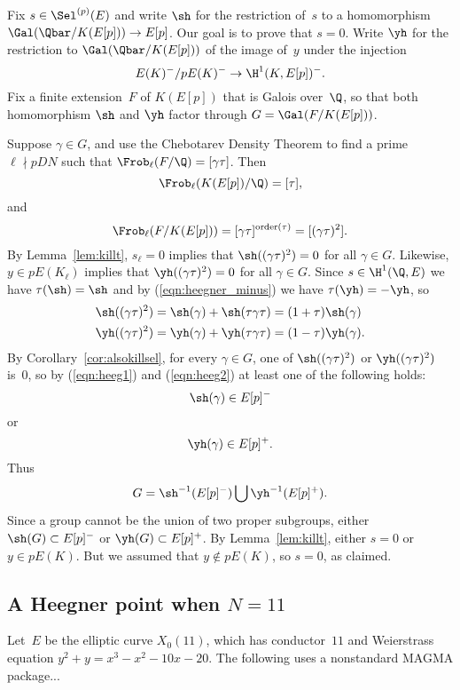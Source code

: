 \documentclass{report}
\begin{document}
Fix $s\in \Sel^{(p)}(E)$ and write $\sh$ for the restriction of~$s$ to
a homomorphism $\Gal(\Qbar/K(E[p]))\to{}E[p]$.  Our goal is to prove that
$s=0$.  Write $\yh$ for the restriction to $\Gal(\Qbar/K(E[p]))$
of the image of~$y$ under the injection
\begin{equation}\label{eqn:heegner_minus}
E(K)^-/p E(K)^- \to \H^1(K,E[p])^-.
\end{equation}
Fix a finite extension~$F$ of $K(E[p])$ that is Galois over~$\Q$,
so that both homomorphism $\sh$ and $\yh$ factor through
$G=\Gal(F/K(E[p]))$.

Suppose $\gamma\in G$, and use the Chebotarev Density Theorem to find
a prime $\ell\nmid pDN$ such that $\Frob_\ell(F/\Q)=[\gamma\tau]$.
Then $$\Frob_{\ell}(K(E[p])/\Q)=[\tau],$$ and
$$
\Frob_\ell(F/K(E[p])) = [\gamma\tau]^{\text{order}(\tau)} = [(\gamma\tau)^2].
$$
By Lemma~\ref{lem:killt}, $s_\ell=0$ implies that $\sh((\gamma\tau)^2)=0$
for all $\gamma\in G$.  Likewise, $y\in p E(K_\ell)$ implies that
$\yh((\gamma\tau)^2)=0$ for all $\gamma\in G$.
Since $s\in\H^1(\Q,E)$ we have $\tau(\sh) = \sh$ and
by (\ref{eqn:heegner_minus}) we have $\tau(\yh)=-\yh$, so
\begin{align}\label{eqn:heeg1}
   \sh((\gamma\tau)^2) &= \sh(\gamma) + \sh(\tau\gamma\tau) = (1+\tau)\sh(\gamma)\\\label{eqn:heeg2}
   \yh((\gamma\tau)^2) &= \yh(\gamma) + \yh(\tau\gamma\tau) = (1-\tau)\yh(\gamma).
\end{align}
By Corollary~\ref{cor:alsokillsel}, for every $\gamma\in G$, one of
$\sh((\gamma\tau)^2)$ or $\yh((\gamma\tau)^2)$ is~$0$, so by
(\ref{eqn:heeg1}) and (\ref{eqn:heeg2}) at least one of the following holds:
$$
\sh(\gamma) \in E[p]^-
$$
or
$$
\yh(\gamma) \in E[p]^+.
$$
Thus
$$
  G = \sh^{-1}(E[p]^-) \bigcup \yh^{-1}(E[p]^+).
$$
Since a group cannot be the union of two proper subgroups, either
$\sh(G) \subset E[p]^-$ or $\yh(G)\subset E[p]^+$.
By Lemma~\ref{lem:killt}, either $s=0$ or $y\in p E(K)$.  But we
assumed that $y \not \in p E(K)$, so $s=0$, as claimed.

\subsection{A Heegner point when $N=11$}
Let~$E$ be the elliptic curve $X_0(11)$, which has conductor~$11$
and Weierstrass equation $y^2 + y = x^3 - x^2 - 10x - 20$.
The following uses a nonstandard MAGMA package...
\end{document}
